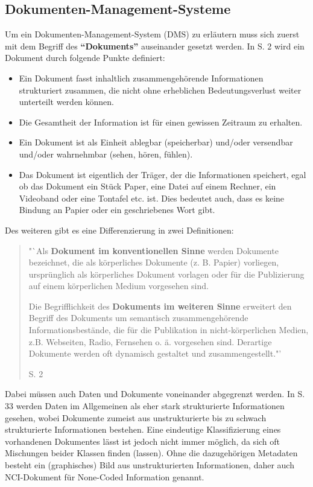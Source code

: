 \subsection{Dokumenten-Management-Systeme}

Um ein Dokumenten-Management-System (\gls{DMS})  zu erläutern muss sich zuerst mit dem Begriff des \textbf{"`Dokuments"'} auseinander gesetzt werden.
In \cite{DMS08} S. 2 wird ein Dokument durch folgende Punkte definiert:

\begin{itemize}
\item Ein Dokument fasst inhaltlich zusammengehörende Informationen strukturiert zusammen, die nicht ohne erheblichen Bedeutungsverlust weiter unterteilt werden können. 
\item Die Gesamtheit der Information ist für einen gewissen Zeitraum zu erhalten.
\item Ein Dokument ist als Einheit ablegbar (speicherbar) und/oder versendbar und/oder wahrnehmbar (sehen, hören, fühlen).
\item Das Dokument ist eigentlich der Träger, der die Informationen speichert, egal ob das Dokument ein Stück Paper, eine Datei auf einem Rechner, ein Videoband oder eine Tontafel etc. ist. Dies bedeutet auch, dass es keine Bindung an Papier oder ein geschriebenes Wort gibt.
\end{itemize}

Des weiteren gibt es eine Differenzierung in zwei Definitionen:

\begin{quote}"`Als \textbf{Dokument im konventionellen Sinne} werden Dokumente bezeichnet, die als körperliches Dokumente (z. B. Papier) vorliegen, ursprünglich als körperliches Dokument vorlagen oder für die Publizierung auf einem körperlichen Medium vorgesehen sind.

Die Begrifflichkeit des \textbf{Dokuments im weiteren Sinne} erweitert den Begriff des Dokuments um semantisch zusammengehörende Informationsbestände, die für die Publikation in nicht-körperlichen Medien, z.B. Webseiten, Radio, Fernsehen o. ä. vorgesehen sind. Derartige Dokumente werden oft dynamisch gestaltet und zusammengestellt."' \begin{flushright}\cite{DMS08} S. 2\end{flushright}\end{quote}

Dabei müssen auch Daten und Dokumente voneinander abgegrenzt werden.
In \cite{DMS08} S. 33 werden Daten im Allgemeinen als eher stark strukturierte Informationen gesehen, wobei Dokumente zumeist aus unstrukturierte bis zu schwach strukturierte Informationen bestehen.
Eine eindeutige Klassifizierung eines vorhandenen Dokumentes lässt ist jedoch nicht immer möglich, da sich oft Mischungen beider Klassen finden (lassen).
Ohne die dazugehörigen Metadaten besteht ein (graphisches) Bild aus unstrukturierten Informationen, daher auch \gls{NCI}-Dokument für None-Coded Information genannt.

